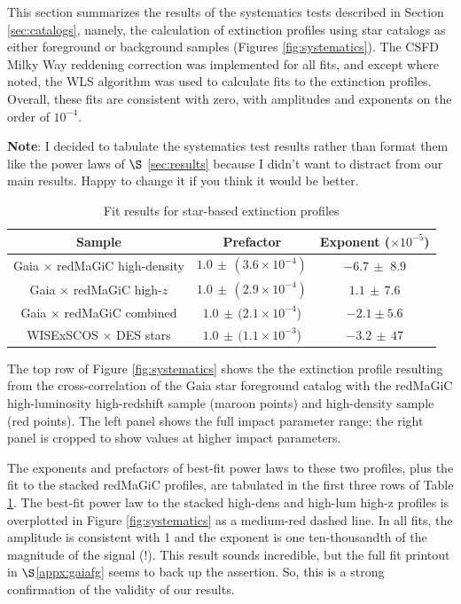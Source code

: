 \documentclass[11pt, oneside]{article}   	%
\newcommand{\ee}[1]{\times 10^{#1}}
\newcommand{\x}{$\times$\xspace}
\begin{document}
This section summarizes the results of the systematics tests described in Section \ref{sec:catalogs}, namely, the calculation of extinction profiles using star catalogs as either foreground or background samples (Figures \ref{fig:systematics}). The CSFD Milky Way reddening correction was implemented for all fits, and except where noted, the WLS algorithm was used to calculate fits to the extinction profiles. Overall, these fits are consistent with zero, with amplitudes and exponents on the order of $10^{-4}$. 

\textbf{Note}: I decided to tabulate the systematics test results rather than format them like the power laws of $\S$ \ref{sec:results} because I didn't want to distract from our main results. Happy to change it if you think it would be better. 


\begin{table}[htp]
\caption{Fit results for star-based extinction profiles}
\begin{center}
\begin{tabular}{|c|c|c|}
\hline
\textbf{Sample} & \textbf{Prefactor} & \textbf{Exponent} ($\ee{-5}$)\\
\hline
Gaia \x redMaGiC high-density & $1.0\, \pm \, (3.6 \ee{-4})$ &  
$-6.7 \, \pm$  8.9\\
Gaia \x redMaGiC high-$z$ & $1.0\, \pm \, (2.9 \ee{-4})$ & 
$1.1 \, \pm \, 7.6$\\
Gaia \x redMaGiC combined & $1.0\, \pm \, (2.1 \ee{-4}$) &
$-2.1 \pm 5.6$\\
WISExSCOS \x DES stars & $1.0 \, \pm \, (1.1 \ee{-3}$) & 
$-3.2\, \pm \, 47$ \\
\hline
\end{tabular}
\end{center}
\label{tab:systematics}
\end{table}%


The top row of Figure \ref{fig:systematics} shows the the extinction profile resulting from the cross-correlation of the Gaia star foreground catalog with the redMaGiC high-luminosity high-redshift sample (maroon points) and high-density sample (red points). The left panel shows the full impact parameter range; the right panel is cropped to show values at higher impact parameters. 

The exponents and prefactors of best-fit power laws to these two profiles, plus the fit to the stacked redMaGiC profiles, are tabulated in the first three rows of Table \ref{tab:systematics}. The best-fit power law to the stacked high-dens and high-lum high-z profiles is overplotted in Figure \ref{fig:systematics} as a medium-red dashed line. In all fits, the amplitude is consistent with 1 and the exponent is one ten-thousandth of the magnitude of the signal (!). This result sounds incredible, but the full fit printout in $\S$\ref{appx:gaiafg} seems to back up the assertion. So, this is a strong confirmation of the validity of our results. 
\end{document}
